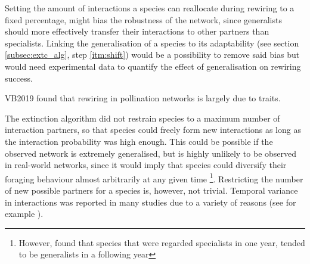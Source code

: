 \documentclass[12pt,a4paper]{article}
\begin{document}

Setting the amount of interactions a species can reallocate during rewiring to a fixed percentage, might bias the robustness of the network, since generalists should more effectively transfer their interactions to other partners than specialists.
Linking the generalisation of a species to its adaptability (see section \ref{subsec:extc_alg}, step \ref{itm:shift}) would be a possibility to remove said bias but would need experimental data to quantify the effect of generalisation on rewiring success.

VB2019 found that rewiring in pollination networks is largely due to traits. 





The extinction algorithm did not restrain species to a maximum number of interaction partners, so that species could freely form new interactions as long as the interaction probability was high enough. This could be possible if the observed network is extremely generalised, but is highly unlikely to be observed in real-world networks, since it would imply that species could diversify their foraging behaviour almost arbitrarily at any given time \footnote{However, \citeauthor{Petanidou2008} found that species that were regarded specialists in one year, tended to be generalists in a following year}. Restricting the number of new possible partners for a species is, however, not trivial. Temporal variance in interactions was reported in many studies due to a variety of reasons (see for example \cite{Olesen2008, Caradonna2017, Schwarz2021}).
\end{document}
